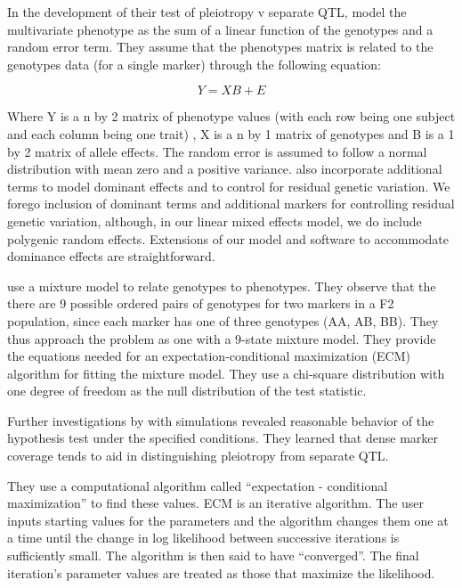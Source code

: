\documentclass[oneside]{book}\usepackage[]{graphicx}\usepackage[]{color}
\begin{document}
In the development of their test of pleiotropy v separate QTL, \citet{jiang1995multiple} model
the multivariate phenotype as the sum of a linear function of the genotypes and a random error term. They assume that the phenotypes matrix is related to the genotypes data (for a single marker) through the following equation:


\begin{equation}
Y = XB + E
\end{equation}


\noindent Where Y is a n by 2 matrix of phenotype values (with each row being one subject and each column being one trait)
, X is a n by 1 matrix of genotypes and B is a 1 by 2 matrix of allele effects.
The random error is assumed to follow a normal distribution with mean zero and a positive variance.
\citet{jiang1995multiple} also incorporate additional terms to model dominant effects and to
control for residual genetic variation.
We forego inclusion of dominant terms and additional markers for controlling residual
genetic variation, although, in our linear mixed effects model, we do include polygenic random
effects. 
Extensions of our model and software to accommodate dominance effects are straightforward.


\citet{jiang1995multiple} use a mixture model to relate genotypes to phenotypes. 
They observe that the there are 9 possible ordered pairs of genotypes for two markers in a F2 population, since each marker has one of three genotypes (AA, AB, BB).
They thus approach the problem as one with a 9-state mixture model. 
They provide the equations needed for an expectation-conditional maximization
(ECM) algorithm for fitting the mixture model.
They use a chi-square distribution with one degree of freedom as the
null distribution of the test statistic. 

Further investigations by \citet{jiang1995multiple} with simulations revealed
reasonable behavior of the hypothesis test under the specified conditions. 
They learned that dense marker coverage tends to aid in distinguishing pleiotropy
from separate QTL. 










They use a computational algorithm called ``expectation - conditional maximization'' to find these values. 
ECM is an iterative algorithm. 
The user inputs starting values for the parameters and the algorithm changes them one at a
time until the change in log likelihood between successive iterations is sufficiently small.
The algorithm is then said to have ``converged''. 
The final iteration’s parameter values are treated as those that maximize the likelihood.
\end{document}
